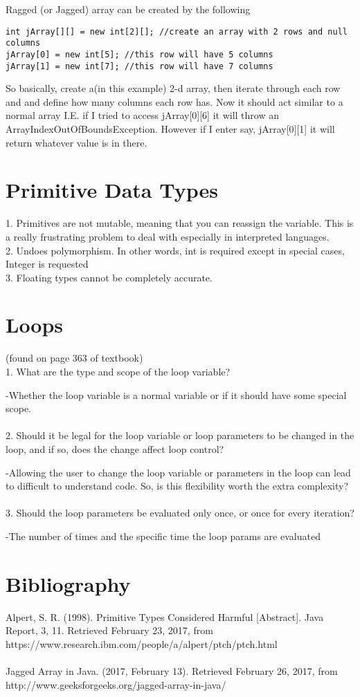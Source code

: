 \documentclass[10pt,letterpaper]{article}
\begin{document}
Ragged (or Jagged) array can be created by the following
\begin{verbatim}
int jArray[][] = new int[2][]; //create an array with 2 rows and null columns 
jArray[0] = new int[5]; //this row will have 5 columns
jArray[1] = new int[7]; //this row will have 7 columns
\end{verbatim}
So basically, create a(in this example) 2-d array, then iterate through each row and and define how many columns each row has. Now it should act similar to a normal array I.E. if I tried to access jArray[0][6] it will throw an ArrayIndexOutOfBoundsException. However if I enter say, jArray[0][1] it will return whatever value is in there.

\section{Primitive Data Types}
1. Primitives are not mutable, meaning that you can reassign the variable. This is a really frustrating problem to deal with especially in interpreted languages. \\
2. Undoes polymorphism. In other words, int is required except in special cases, Integer is requested \\
3. Floating types cannot be completely accurate. 

\section{Loops}
(found on page 363 of textbook)\\
1. What are the type and scope of the loop variable?


-Whether the loop variable is a normal variable or if it should have some special scope.\\\\
2. Should it be legal for the loop variable or loop parameters to be changed in the loop, and if so, does the change affect loop control?

-Allowing the user to change the loop variable or parameters in the loop can lead to difficult to understand code. So, is this flexibility worth the extra complexity?\\\\
3. Should the loop parameters be evaluated only once, or once for every iteration? 

-The number of times and the specific time the loop params are evaluated 

\section{Bibliography}
Alpert, S. R. (1998). Primitive Types Considered Harmful [Abstract]. Java Report, 3, 11. Retrieved February 23, 2017, from https://www.research.ibm.com/people/a/alpert/ptch/ptch.html
\\\\
Jagged Array in Java. (2017, February 13). Retrieved February 26, 2017, from http://www.geeksforgeeks.org/jagged-array-in-java/
\end{document}
